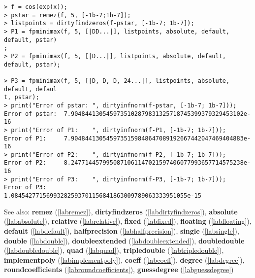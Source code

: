 \begin{center}\begin{minipage}{15cm}\begin{Verbatim}[frame=single]
> f = cos(exp(x));
> pstar = remez(f, 5, [-1b-7;1b-7]);
> listpoints = dirtyfindzeros(f-pstar, [-1b-7; 1b-7]);
> P1 = fpminimax(f, 5, [|DD...|], listpoints, absolute, default, default, pstar)
;
> P2 = fpminimax(f, 5, [|D...|], listpoints, absolute, default, default, pstar);

> P3 = fpminimax(f, 5, [|D, D, D, 24...|], listpoints, absolute, default, defaul
t, pstar);
> print("Error of pstar: ", dirtyinfnorm(f-pstar, [-1b-7; 1b-7]));
Error of pstar:  7.9048441305459735102879831325718745399379329453102e-16
> print("Error of P1:    ", dirtyinfnorm(f-P1, [-1b-7; 1b-7]));
Error of P1:     7.9048441305459735159848647089192667442047469404883e-16
> print("Error of P2:    ", dirtyinfnorm(f-P2, [-1b-7; 1b-7]));
Error of P2:     8.2477144579950871061147021597406077993657714575238e-16
> print("Error of P3:    ", dirtyinfnorm(f-P3, [-1b-7; 1b-7]));
Error of P3:     1.08454277156993282593701156841863009789063333951055e-15
\end{Verbatim}
\end{minipage}\end{center}
See also: \textbf{remez} (\ref{labremez}), \textbf{dirtyfindzeros} (\ref{labdirtyfindzeros}), \textbf{absolute} (\ref{lababsolute}), \textbf{relative} (\ref{labrelative}), \textbf{fixed} (\ref{labfixed}), \textbf{floating} (\ref{labfloating}), \textbf{default} (\ref{labdefault}), \textbf{halfprecision} (\ref{labhalfprecision}), \textbf{single} (\ref{labsingle}), \textbf{double} (\ref{labdouble}), \textbf{doubleextended} (\ref{labdoubleextended}), \textbf{doubledouble} (\ref{labdoubledouble}), \textbf{quad} (\ref{labquad}), \textbf{tripledouble} (\ref{labtripledouble}), \textbf{implementpoly} (\ref{labimplementpoly}), \textbf{coeff} (\ref{labcoeff}), \textbf{degree} (\ref{labdegree}), \textbf{roundcoefficients} (\ref{labroundcoefficients}), \textbf{guessdegree} (\ref{labguessdegree})
